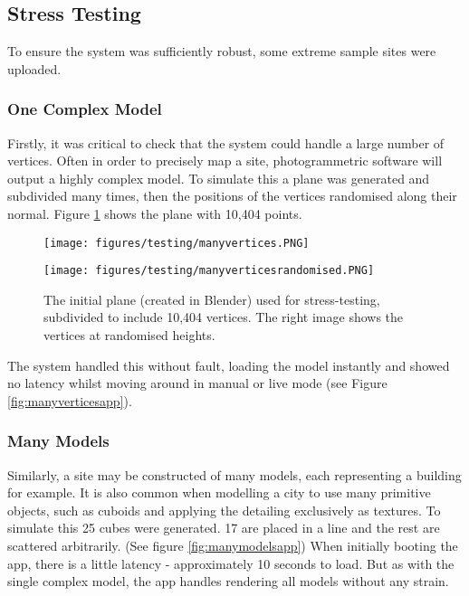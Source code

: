 \documentclass{article}
\begin{document}
\subsection{Stress Testing}
To ensure the system was sufficiently robust, some extreme sample sites were uploaded.

\subsubsection{One Complex Model}
Firstly, it was critical to check that the system could handle a large number of vertices. Often in order to precisely map a site, photogrammetric software will output a highly complex model. To simulate this a plane was generated and subdivided many times, then the positions of the vertices randomised along their normal. Figure \ref{fig:stressplane} shows the plane with 10,404 points.

\begin{figure}[H]
\centering
\begin{minipage}{.5\textwidth}
  \centering
  \texttt{[image: figures/testing/manyvertices.PNG]}
\end{minipage}%
\begin{minipage}{.5\textwidth}
  \centering
  \texttt{[image: figures/testing/manyverticesrandomised.PNG]}
\end{minipage}
\caption{The initial plane (created in Blender) used for stress-testing, subdivided to include 10,404 vertices. The right image shows the vertices at randomised heights.}
\label{fig:stressplane}
\end{figure}

The system handled this without fault, loading the model instantly and showed no latency whilst moving around in manual or live mode (see Figure \ref{fig:manyverticesapp}). 

\subsubsection{Many Models}
Similarly, a site may be constructed of many models, each representing a building for example. It is also common when modelling a city to use many primitive objects, such as cuboids and applying the detailing exclusively as textures. To simulate this 25 cubes were generated. 17 are placed in a line and the rest are scattered arbitrarily. (See figure \ref{fig:manymodelsapp}) When initially booting the app, there is a little latency - approximately 10 seconds to load. But as with the single complex model, the app handles rendering all models without any strain. 
\end{document}
